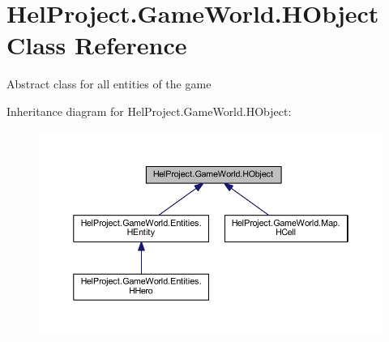 \hypertarget{class_hel_project_1_1_game_world_1_1_h_object}{}\section{Hel\+Project.\+Game\+World.\+H\+Object Class Reference}
\label{class_hel_project_1_1_game_world_1_1_h_object}


Abstract class for all entities of the game  




Inheritance diagram for Hel\+Project.\+Game\+World.\+H\+Object\+:
\nopagebreak
\begin{figure}[H]
\begin{center}
\leavevmode
\includegraphics[width=350pt]{class_hel_project_1_1_game_world_1_1_h_object__inherit__graph}
\end{center}
\end{figure}
